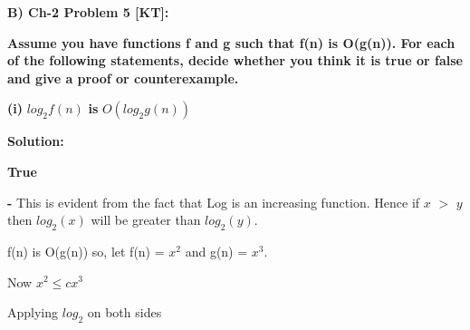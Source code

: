 \documentclass[letterpaper,portrait,12pt]{article}
\begin{document}
\begin{flushleft}

\end{flushleft}


\begin{flushleft}

\end{flushleft}


\begin{flushleft}
\textbf{B) Ch-2 Problem 5 [KT]: }
\end{flushleft}


\begin{flushleft}
\textbf{	Assume you have functions f and g such that f(n) is O(g(n)). For each of the following statements, decide whether you think it is true or false and give a proof or counterexample.}
\end{flushleft}


\begin{flushleft}
\textbf{(i) }$log_2 f(n)$\textbf{ is }$O(log_2g(n))$
\end{flushleft}


\begin{flushleft}
\textbf{Solution:}
\end{flushleft}


\begin{flushleft}
\textbf{True}
\end{flushleft}


\begin{flushleft}
\textbf{- }This is evident from the fact that Log is an increasing function. Hence if $x$ $>$ $y$ then $log_2(x)$ will be greater than $log_2(y)$.
\end{flushleft}


\begin{flushleft}

\end{flushleft}


\begin{flushleft}
f(n) is O(g(n)) so, let f(n) = $x^2$ and g(n) = $x^3$.
\end{flushleft}


\begin{flushleft}

\end{flushleft}


\begin{flushleft}
Now $x^2 \le c  x^3$ 
\end{flushleft}


\begin{flushleft}
Applying $log_2$ on both sides
\end{flushleft}
\end{document}
